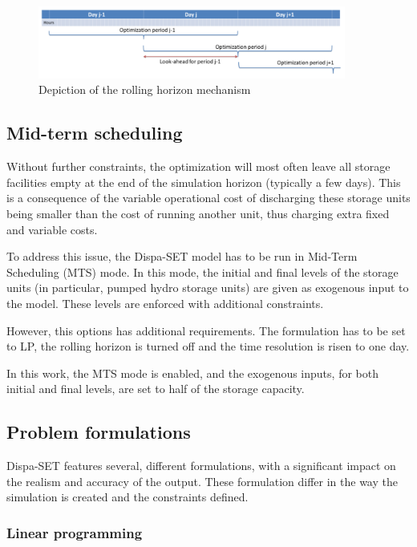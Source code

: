\begin{figure}[h]
    \centering
    \includegraphics[width=0.9\textwidth]{resources/images/rolling_horizon.png}
    \caption{Depiction of the rolling horizon mechanism}
    \label{fig:rolling-horizon}
\end{figure}

\subsection{Mid-term scheduling}

Without further constraints, the optimization will most often leave all storage facilities empty at the end of the simulation horizon (typically a few days). This is a consequence of the variable operational cost of discharging these storage units being smaller than the cost of running another unit, thus charging extra fixed and variable costs.

To address this issue, the Dispa-SET model has to be run in Mid-Term Scheduling (MTS) mode. In this mode, the initial and final levels of the storage units (in particular, pumped hydro storage units) are given as exogenous input to the model. These levels are enforced with additional constraints.

However, this options has additional requirements. The formulation has to be set to LP, the rolling horizon is turned off and the time resolution is risen to one day.

In this work, the MTS mode is enabled, and the exogenous inputs, for both initial and final levels, are set to half of the storage capacity.

\subsection{Problem formulations}

Dispa-SET features several, different formulations, with a significant impact on the realism and accuracy of the output. These formulation differ in the way the simulation is created and the constraints defined.

\subsubsection{Linear programming}

